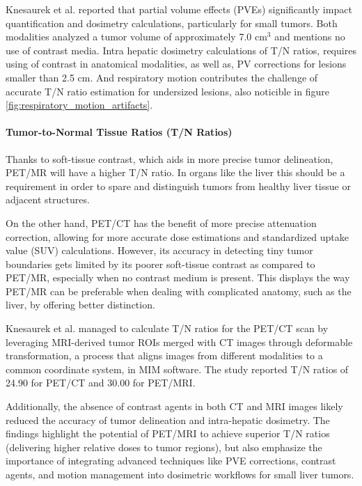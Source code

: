 \documentclass[11pt]{article} %
\begin{document}
\begin{multicols}{2}
Knesaurek et al. \cite{knesaurek2018} reported that partial volume effects (PVEs) significantly impact quantification and dosimetry calculations, particularly for small tumors. Both modalities analyzed a tumor volume of approximately 7.0 $\text{cm}^3$ and mentions no use of contrast media. Intra hepatic dosimetry calculations of T/N ratios, requires using of contrast in anatomical modalities, as well as,
PV corrections for lesions smaller than 2.5 $\text{cm}$. And respiratory motion contributes the challenge of accurate T/N ratio estimation for undersized lesions, also noticible in figure \ref{fig:respiratory_motion_artifacts}.

\paragraph{Tumor-to-Normal Tissue Ratios (T/N Ratios)}

Thanks to soft-tissue contrast, which aids in more precise tumor delineation, PET/MR will have a higher T/N ratio. In organs like the liver this should be a requirement in order to spare and distinguish tumors from healthy liver tissue or adjacent structures.


On the other hand, PET/CT has the benefit of more precise attenuation correction, allowing for more accurate dose estimations and standardized uptake value (SUV) calculations. However, its accuracy in detecting tiny tumor boundaries gets limited by its poorer soft-tissue contrast as compared to PET/MR, especially when no contrast medium is present. This displays the way PET/MR can be preferable when dealing with complicated anatomy, such as the liver, by offering better distinction.


Knesaurek et al. \cite{knesaurek2018} managed to calculate T/N ratios for the PET/CT scan by leveraging MRI-derived tumor ROIs merged with CT images through deformable transformation, a process that aligns images from different modalities to a common coordinate system, in MIM software. The study reported T/N ratios of 24.90 for PET/CT and 30.00 for PET/MRI. 

Additionally, the absence of contrast agents in both CT and MRI images likely reduced the accuracy of tumor delineation and intra-hepatic dosimetry. The findings highlight the potential of PET/MRI to achieve superior T/N ratios (delivering higher relative doses to tumor regions), but also emphasize the importance of integrating advanced techniques like PVE corrections, contrast agents, and motion management into dosimetric workflows for small liver tumors.




\end{multicols}
\end{document}

